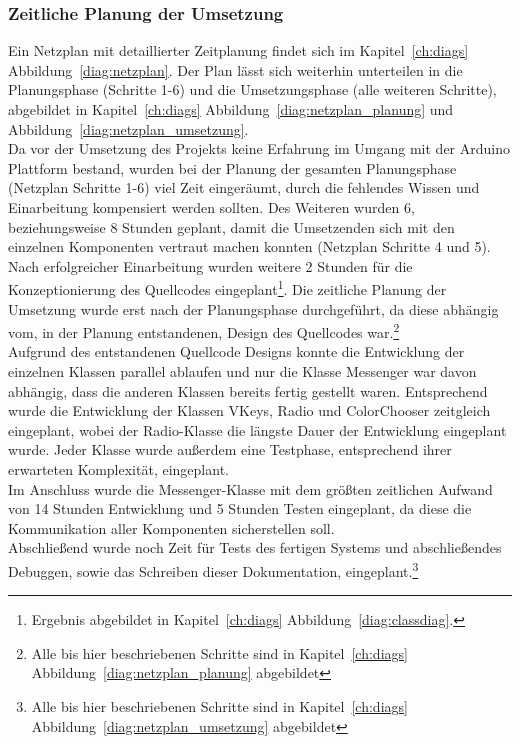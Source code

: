 \documentclass[a4paper, 11pt]{scrartcl}
\begin{document}
\subsubsection{Zeitliche Planung der Umsetzung}
Ein Netzplan mit detaillierter Zeitplanung findet sich im Kapitel~\ref{ch:diags} Abbildung~\ref{diag:netzplan}. Der Plan lässt sich weiterhin unterteilen in die
Planungsphase (Schritte 1-6) und die Umsetzungsphase (alle weiteren Schritte), abgebildet in Kapitel~\ref{ch:diags} Abbildung~\ref{diag:netzplan_planung} 
und Abbildung~\ref{diag:netzplan_umsetzung}.
\\
Da vor der Umsetzung des Projekts keine Erfahrung im Umgang mit der Arduino Plattform bestand, wurden bei der Planung der gesamten Planungsphase (Netzplan Schritte 1-6) 
viel Zeit eingeräumt, durch die fehlendes Wissen und Einarbeitung kompensiert werden sollten. Des Weiteren wurden 6, beziehungsweise 8 Stunden geplant, damit die 
Umsetzenden sich mit den einzelnen Komponenten vertraut machen konnten (Netzplan Schritte 4 und 5). Nach erfolgreicher Einarbeitung wurden weitere 2 Stunden
für die Konzeptionierung des Quellcodes eingeplant\footnote{Ergebnis abgebildet in Kapitel~\ref{ch:diags} Abbildung~\ref{diag:classdiag}.}. Die zeitliche 
Planung der Umsetzung wurde erst nach der Planungsphase durchgeführt, da diese abhängig vom, in der Planung entstandenen, Design des Quellcodes war.\footnote{Alle bis hier 
beschriebenen Schritte sind in Kapitel~\ref{ch:diags} Abbildung~\ref{diag:netzplan_planung} abgebildet}
\\
Aufgrund des entstandenen Quellcode Designs konnte die Entwicklung der einzelnen Klassen parallel ablaufen und nur die Klasse \glqq Messenger\grqq{} war davon abhängig,
dass die anderen Klassen bereits fertig gestellt waren. Entsprechend wurde die Entwicklung der Klassen \glqq VKeys\grqq , \glqq Radio\grqq{} und \glqq ColorChooser\grqq{}
zeitgleich eingeplant, wobei der Radio-Klasse die längste Dauer der Entwicklung eingeplant wurde. Jeder Klasse wurde außerdem eine Testphase, entsprechend ihrer erwarteten
Komplexität, eingeplant.
\\
Im Anschluss wurde die Messenger-Klasse mit dem größten zeitlichen Aufwand von 14 Stunden Entwicklung und 5 Stunden Testen eingeplant, da diese die Kommunikation
aller Komponenten sicherstellen soll.
\\
Abschließend wurde noch Zeit für Tests des fertigen Systems und abschließendes Debuggen, sowie das Schreiben dieser Dokumentation, eingeplant.\footnote{Alle bis hier 
beschriebenen Schritte sind in Kapitel~\ref{ch:diags} Abbildung~\ref{diag:netzplan_umsetzung} abgebildet}
\end{document}
